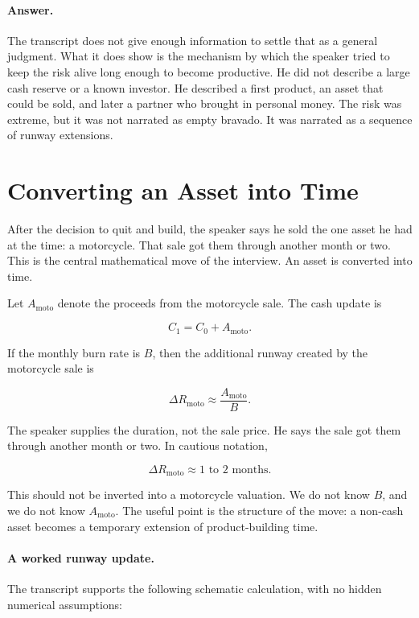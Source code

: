 \paragraph{Answer.}
The transcript does not give enough information to settle that as a general judgment. What it does show is the mechanism by which the speaker tried to keep the risk alive long enough to become productive. He did not describe a large cash reserve or a known investor. He described a first product, an asset that could be sold, and later a partner who brought in personal money. The risk was extreme, but it was not narrated as empty bravado. It was narrated as a sequence of runway extensions.

\section{Converting an Asset into Time}

After the decision to quit and build, the speaker says he sold the one asset he had at the time: a motorcycle. That sale got them through another month or two. This is the central mathematical move of the interview. An asset is converted into time.

Let \(A_{\mathrm{moto}}\) denote the proceeds from the motorcycle sale. The cash update is

\begin{equation}
C_1 = C_0 + A_{\mathrm{moto}} .
\end{equation}

If the monthly burn rate is \(B\), then the additional runway created by the motorcycle sale is

\begin{equation}
\Delta R_{\mathrm{moto}} \approx \frac{A_{\mathrm{moto}}}{B}.
\end{equation}

The speaker supplies the duration, not the sale price. He says the sale got them through another month or two. In cautious notation,

\begin{equation}
\Delta R_{\mathrm{moto}} \approx 1\text{ to }2 \text{ months}.
\end{equation}

This should not be inverted into a motorcycle valuation. We do not know \(B\), and we do not know \(A_{\mathrm{moto}}\). The useful point is the structure of the move: a non-cash asset becomes a temporary extension of product-building time.

\paragraph{A worked runway update.}
The transcript supports the following schematic calculation, with no hidden numerical assumptions:


